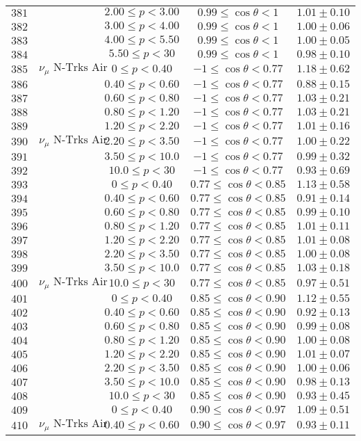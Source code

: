 \begin{longtable}[c]{ccccc}
$381$ &  & $2.00\leq p<3.00$ & $0.99\leq\cos\theta<1$ & $1.01\pm0.10$\tabularnewline
$382$ &  & $3.00\leq p<4.00$ & $0.99\leq\cos\theta<1$ & $1.00\pm0.06$\tabularnewline
$383$ &  & $4.00\leq p<5.50$ & $0.99\leq\cos\theta<1$ & $1.00\pm0.05$\tabularnewline
$384$ &  & $5.50\leq p<30$ & $0.99\leq\cos\theta<1$ & $0.98\pm0.10$\tabularnewline
$385$ & $\nu_{\mu}\text{ N-Trks Air}$ & $0\leq p<0.40$ & $-1\leq\cos\theta<0.77$ & $1.18\pm0.62$\tabularnewline
$386$ &  & $0.40\leq p<0.60$ & $-1\leq\cos\theta<0.77$ & $0.88\pm0.15$\tabularnewline
$387$ &  & $0.60\leq p<0.80$ & $-1\leq\cos\theta<0.77$ & $1.03\pm0.21$\tabularnewline
$388$ &  & $0.80\leq p<1.20$ & $-1\leq\cos\theta<0.77$ & $1.03\pm0.21$\tabularnewline
$389$ &  & $1.20\leq p<2.20$ & $-1\leq\cos\theta<0.77$ & $1.01\pm0.16$\tabularnewline
$390$ & $\nu_{\mu}\text{ N-Trks Air}$ & $2.20\leq p<3.50$ & $-1\leq\cos\theta<0.77$ & $1.00\pm0.22$\tabularnewline
$391$ &  & $3.50\leq p<10.0$ & $-1\leq\cos\theta<0.77$ & $0.99\pm0.32$\tabularnewline
$392$ &  & $10.0\leq p<30$ & $-1\leq\cos\theta<0.77$ & $0.93\pm0.69$\tabularnewline
$393$ &  & $0\leq p<0.40$ & $0.77\leq\cos\theta<0.85$ & $1.13\pm0.58$\tabularnewline
$394$ &  & $0.40\leq p<0.60$ & $0.77\leq\cos\theta<0.85$ & $0.91\pm0.14$\tabularnewline
$395$ &  & $0.60\leq p<0.80$ & $0.77\leq\cos\theta<0.85$ & $0.99\pm0.10$\tabularnewline
$396$ &  & $0.80\leq p<1.20$ & $0.77\leq\cos\theta<0.85$ & $1.01\pm0.11$\tabularnewline
$397$ &  & $1.20\leq p<2.20$ & $0.77\leq\cos\theta<0.85$ & $1.01\pm0.08$\tabularnewline
$398$ &  & $2.20\leq p<3.50$ & $0.77\leq\cos\theta<0.85$ & $1.00\pm0.08$\tabularnewline
$399$ &  & $3.50\leq p<10.0$ & $0.77\leq\cos\theta<0.85$ & $1.03\pm0.18$\tabularnewline
$400$ & $\nu_{\mu}\text{ N-Trks Air}$ & $10.0\leq p<30$ & $0.77\leq\cos\theta<0.85$ & $0.97\pm0.51$\tabularnewline
$401$ &  & $0\leq p<0.40$ & $0.85\leq\cos\theta<0.90$ & $1.12\pm0.55$\tabularnewline
$402$ &  & $0.40\leq p<0.60$ & $0.85\leq\cos\theta<0.90$ & $0.92\pm0.13$\tabularnewline
$403$ &  & $0.60\leq p<0.80$ & $0.85\leq\cos\theta<0.90$ & $0.99\pm0.08$\tabularnewline
$404$ &  & $0.80\leq p<1.20$ & $0.85\leq\cos\theta<0.90$ & $1.00\pm0.08$\tabularnewline
$405$ &  & $1.20\leq p<2.20$ & $0.85\leq\cos\theta<0.90$ & $1.01\pm0.07$\tabularnewline
$406$ &  & $2.20\leq p<3.50$ & $0.85\leq\cos\theta<0.90$ & $1.00\pm0.06$\tabularnewline
$407$ &  & $3.50\leq p<10.0$ & $0.85\leq\cos\theta<0.90$ & $0.98\pm0.13$\tabularnewline
$408$ &  & $10.0\leq p<30$ & $0.85\leq\cos\theta<0.90$ & $0.93\pm0.45$\tabularnewline
$409$ &  & $0\leq p<0.40$ & $0.90\leq\cos\theta<0.97$ & $1.09\pm0.51$\tabularnewline
$410$ & $\nu_{\mu}\text{ N-Trks Air}$ & $0.40\leq p<0.60$ & $0.90\leq\cos\theta<0.97$ & $0.93\pm0.11$\tabularnewline

\end{longtable}
